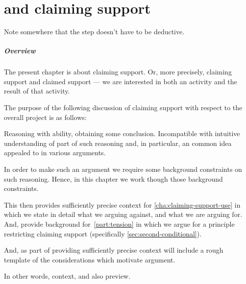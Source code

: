 \chapter{ and claiming support}
\label{cha:claiming-support}

\begin{note}
  \color{red}
  Note somewhere that the step doesn't have to be deductive.
\end{note}

\paragraph*{Overview}

\begin{note}
  The present chapter is about claiming support.
  Or, more precisely, claiming support and claimed support --- we are interested in both an activity and the result of that activity.

  The purpose of the following discussion of claiming support with respect to the {\color{red} overall project} is as follows:

  Reasoning with ability, obtaining some conclusion.
  Incompatible with intuitive understanding of part of such reasoning and, in particular, an common idea appealed to in various arguments.

  In order to make such an argument we require some background constraints on such reasoning.
  Hence, in this chapter we work though those background constraints.

  This then provides sufficiently precise context for \autoref{cha:claiming-support-use} in which we state in detail what we arguing against, and what we are arguing for.
  And, provide background for~\autoref{part:tension} in which we argue for a principle restricting claiming support (specifically \autoref{sec:second-conditional}).

  And, as part of providing sufficiently precise context will include a rough template of the considerations which motivate argument.

  In other words, context, and also preview.
\end{note}


